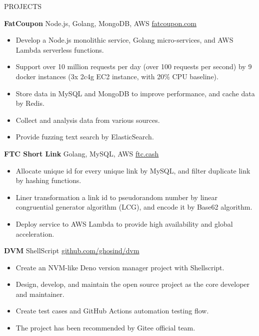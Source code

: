 \documentclass{resume} %
\begin{document}
\begin{rSection}{PROJECTS}
\vspace{-1.25em}

\item \textbf{FatCoupon} {Node.js, Golang, MongoDB, AWS} \hfill \href{www.fatcoupon.com}{fatcoupon.com}
\begin{itemize}
  \itemsep -3pt {}
  \item Develop a Node.js monolithic service, Golang micro-services, and AWS Lambda serverless functions.
  \item Support over 10 million requests per day (over 100 requests per second) by 9 docker instances (3x 2c4g EC2 instance, with 20\% CPU baseline).
  \item Store data in MySQL and MongoDB to improve performance, and cache data by Redis.
  \item Collect and analysis data from various sources.
  \item Provide fuzzing text search by ElasticSearch.
\end{itemize}

\item \textbf{FTC Short Link} {Golang, MySQL, AWS} \hfill \href{ftc.cash}{ftc.cash}
\begin{itemize}
  \itemsep -3pt {}
  \item Allocate unique id for every unique link by MySQL, and filter duplicate link by hashing functions.
  \item Liner transformation a link id to pseudorandom number by linear congruential generator algorithm (LCG), and encode it by Base62 algorithm.
  \item Deploy service to AWS Lambda to provide high availability and global acceleration.
\end{itemize}

\item \textbf{DVM} {ShellScript} \hfill \href{github.com/ghosind/dvm}{github.com/ghosind/dvm}
\begin{itemize}
  \itemsep -3pt {}
  \item Create an NVM-like Deno version manager project with Shellscript.
  \item Design, develop, and maintain the open source project as the core developer and maintainer.
  \item Create test cases and GitHub Actions automation testing flow.
  \item The project has been recommended by Gitee official team.
\end{itemize}

\end{rSection}
\end{document}
